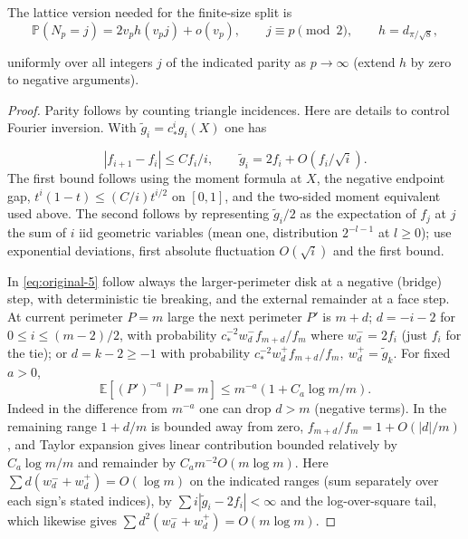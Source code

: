 \begin{lemma}\label{disk:volume-llt}

The lattice version needed for the finite-size split is
\begin{equation}
\mathbb P(N_p=j)=2v_p h(v_p j)+o(v_p),\qquad j\equiv p\pmod 2,\qquad
 h=d_{\pi/\sqrt8},
 \label{eq:original-10}
\end{equation}

uniformly over all integers $j$ of the indicated parity as $p\to\infty$ (extend \(h\) by zero to negative arguments). 

\end{lemma}\begin{proof}

Parity follows by counting triangle incidences.
Here are details to control Fourier inversion.
With \(\widetilde g_i=c_*^i g_i(X)\) one has

\[
 |f_{i+1}-f_i|\le C f_i/i,\qquad
 \widetilde g_i=2f_i+O(f_i/\sqrt i).
\]
The first bound follows using the moment formula at \(X\), the negative endpoint gap, \(t^i(1-t)\le (C/i)t^{i/2}\) on \([0,1]\), and the two-sided moment equivalent used above.
The second follows by representing \(\widetilde g_i/2\) as the expectation of \(f_j\) at \(j\) the sum of \(i\) iid geometric variables (mean one, distribution \(2^{-l-1}\) at \(l\ge0\)); use exponential deviations, first absolute fluctuation \(O(\sqrt i)\) and the first bound.

In \eqref{eq:original-5} follow always the larger-perimeter disk at a negative (bridge) step, with deterministic tie breaking, and the external remainder at a face step.
At current perimeter \(P=m\) large the next perimeter \(P'\) is \(m+d\); \(d=-i-2\) for \(0\le i\le(m-2)/2\), with probability \(c_*^{-2}w_d^- f_{m+d}/f_m\) where \(w_d^-=2 f_i\) (just \(f_i\) for the tie); or \(d=k-2\ge-1\) with probability \(c_*^{-2}w_d^+ f_{m+d}/f_m,\ w_d^+=\widetilde g_k\).
For fixed \(a>0\),
\[
 \mathbb E[(P')^{-a}\mid P=m]\le m^{-a}(1+C_a\log m/m).
\]
Indeed in the difference from \(m^{-a}\) one can drop \(d>m\) (negative terms).
In the remaining range \(1+d/m\) is bounded away from zero, \(f_{m+d}/f_m=1+O(|d|/m)\), and Taylor expansion gives linear contribution bounded relatively by \(C_a\log m/m\) and remainder by \(C_a m^{-2} O(m\log m)\).
Here \(\sum d(w_d^-+w_d^+)=O(\log m)\) on the indicated ranges (sum separately over each sign's stated indices), by \(\sum i|\widetilde g_i-2 f_i|<\infty\) and the log-over-square tail, which likewise gives \(\sum d^2(w_d^-+w_d^+)=O(m\log m)\).


\end{proof}
